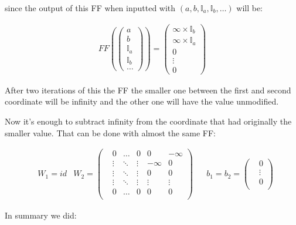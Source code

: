 since the output of this FF when inputted with $(a, b, \mathbb{I}_a, \mathbb{I}_b, \dots)$ will be: 

\begin{align*}
    FF\left(\left(\begin{matrix}
        a \\ b \\ \mathbb{I}_a \\ \mathbb{I}_b \\ \dots
    \end{matrix}\right)\right) 
    = 
    \left(\begin{matrix}
        \infty \times \mathbb{I}_b \\
        \infty \times \mathbb{I}_a \\
        0 \\
        \vdots \\
        0
    \end{matrix}\right)
\end{align*}

After two iterations of this the FF the smaller one between the first and second coordinate will be infinity and the other one will have the value unmodified.

Now it's enough to subtract infinity from the coordinate that had originally the smaller value. That can be done with almost the same FF:

\begin{align*}
    & W_1 = id
    & W_2  = \left(\begin{matrix}
        & 0         &\dots  &0      & 0         & -\infty    \\
        & \vdots    &\ddots &\vdots & -\infty    & 0         \\
        & \vdots    &\ddots &\vdots & 0         & 0         \\
        & \vdots    &\ddots &\vdots & \vdots    & \vdots    \\
        & 0         &\dots  &0      & 0         & 0         \\
    \end{matrix}\right) &
    & b_1 = b_2 = \left(\begin{matrix}
        & 0      \\
        & \vdots \\
        & 0      \\
    \end{matrix}\right) 
\end{align*}

In summary we did:


